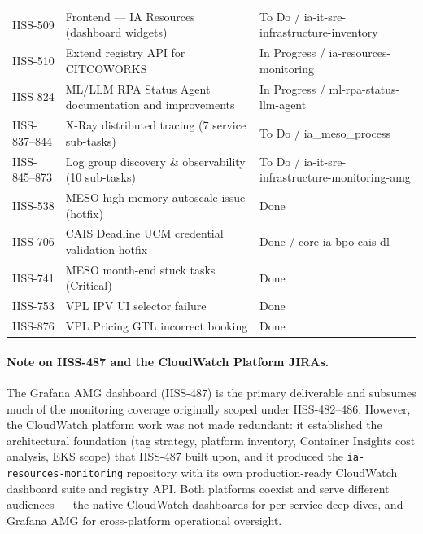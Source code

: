 \begin{table}[ht]
\begin{tabular}{p{1.8cm}p{5.5cm}p{4.5cm}}
IISS-509  & Frontend --- IA Resources (dashboard widgets) & To Do / ia-it-sre-infrastructure-inventory \\
IISS-510  & Extend registry API for CITCOWORKS & In Progress / ia-resources-monitoring \\
IISS-824  & ML/LLM RPA Status Agent documentation and improvements & In Progress / ml-rpa-status-llm-agent \\
IISS-837--844 & X-Ray distributed tracing (7 service sub-tasks) & To Do / ia\_meso\_process \\
IISS-845--873 & Log group discovery \& observability (10 sub-tasks) & To Do / ia-it-sre-infrastructure-monitoring-amg \\
IISS-538  & MESO high-memory autoscale issue (hotfix) & Done \\
IISS-706  & CAIS Deadline UCM credential validation hotfix & Done / core-ia-bpo-cais-dl \\
IISS-741  & MESO month-end stuck tasks (Critical) & Done \\
IISS-753  & VPL IPV UI selector failure & Done \\
IISS-876  & VPL Pricing GTL incorrect booking & Done \\
\bottomrule
\end{tabular}
\end{table}

\paragraph{Note on IISS-487 and the CloudWatch Platform JIRAs.}
The Grafana AMG dashboard (IISS-487) is the primary deliverable and
subsumes much of the monitoring coverage originally scoped under
IISS-482--486. However, the CloudWatch platform work was not made redundant:
it established the architectural foundation (tag strategy, platform
inventory, Container Insights cost analysis, EKS scope) that IISS-487
built upon, and it produced the \texttt{ia-resources-monitoring} repository
with its own production-ready CloudWatch dashboard suite and registry API.
Both platforms coexist and serve different audiences --- the native
CloudWatch dashboards for per-service deep-dives, and Grafana AMG for
cross-platform operational oversight.

